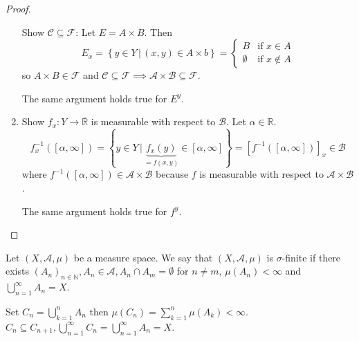 \documentclass{article}
\newcommand{\setdef}[2]{\left\{\left.#1\,\right|\,#2\right\}}
\begin{document}
\begin{proof}
\begin{enumerate}
      Show $\mathcal C \subseteq \mathcal F$: Let $E = A \times B$. Then
      \[ E_x = \setdef{y \in Y}{(x, y) \in A \times b} = \begin{cases} B & \text{if } x \in A \\ \emptyset & \text{if } x \not\in A \end{cases} \]
      so $A \times B \in \mathcal F$ and $\mathcal C \subseteq \mathcal F \implies \mathcal A \times \mathcal B \subseteq \mathcal F$.

      The same argument holds true for $E^y$.

    \item Show $f_x: Y \to \overline{\mathbb R}$ is measurable with respect to $\mathcal B$. Let $\alpha \in \mathbb R$.
      \[ f_x^{-1}([\alpha, \infty]) = \setdef{y \in Y}{\underbrace{f_x(y)}_{=f(x,y)} \in [\alpha, \infty]} = \left[f^{-1}([\alpha, \infty])\right]_x \in \mathcal B \]
      where $f^{-1}([\alpha, \infty]) \in \mathcal A \times \mathcal B$ because $f$ is measurable with respect to $\mathcal A \times \mathcal B$.

      The same argument holds true for $f^y$.
  \end{enumerate}
\end{proof}

Let $(X, \mathcal A, \mu)$ be a measure space. We say that $(X, \mathcal A, \mu)$ is $\sigma$-finite if there exists
$(A_n)_{n \in \mathbb N}, A_n \in \mathcal A, A_n \cap A_m = \emptyset$ for $n \neq m$, $\mu(A_n) < \infty$ and $\bigcup_{n=1}^\infty A_n = X$.

Set $C_n = \bigcup_{k=1}^n A_n$ then $\mu(C_n) = \sum_{k=1}^n \mu(A_k) < \infty$.
$C_n \subseteq C_{n+1}, \bigcup_{n=1}^\infty C_n = \bigcup_{n=1}^\infty A_n = X$.
\end{document}
